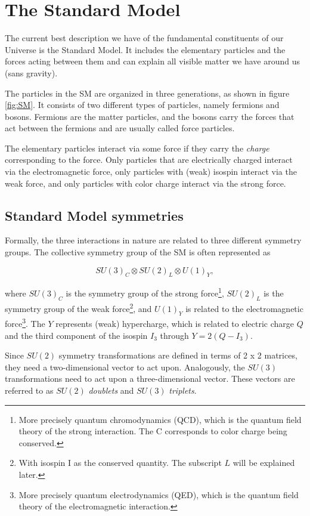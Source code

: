 \section{The Standard Model}
\label{sec:SM}
The current best description we have of the fundamental constituents of our Universe is the Standard Model. It includes the elementary particles and the forces acting between them and can explain all visible matter we have around us (sans gravity). 

The particles in the SM are organized in three generations, as shown in figure \ref{fig:SM}. It consists of two different types of particles, namely fermions and bosons. Fermions are the matter particles, and the bosons carry the forces that act between the fermions and are usually called force particles. 

The elementary particles interact via some force if they carry the \textit{charge} corresponding to the force. Only particles that are electrically charged interact via the electromagnetic force, only particles with (weak) isospin interact via the weak force, and only particles with color charge interact via the strong force.  

\subsection{Standard Model symmetries}
Formally, the three interactions in nature are related to three different symmetry groups. The collective symmetry group of the SM is often represented as

\begin{equation}
    SU(3)_C \otimes SU(2)_L \otimes U(1)_Y, 
    \label{eq:SM_symmetry}
\end{equation}

where $SU(3)_C$ is the symmetry group of the strong force\footnote{More precisely quantum chromodynamics (QCD), which is the quantum field theory of the strong interaction. The C corresponds to color charge being conserved.}, $SU(2)_L$ is the symmetry group of the weak force\footnote{With isospin I as the conserved quantity. The subscript $L$ will be explained later.}, and $U(1)_Y$ is related to the electromagnetic force\footnote{More precisely quantum electrodynamics (QED), which is the quantum field theory of the electromagnetic interaction.}. The $Y$ represents (weak) hypercharge, which is related to electric charge $Q$ and the third component of the isospin $I_3$ through $Y = 2(Q-I_3)$.

Since $SU(2)$ symmetry transformations are defined in terms of 2 x 2 matrices, they need a two-dimensional vector to act upon. Analogously, the $SU(3)$ transformations need to act upon a three-dimensional vector. These vectors are referred to as $SU(2)$ \textit{doublets} and $SU(3)$ \textit{triplets}.


